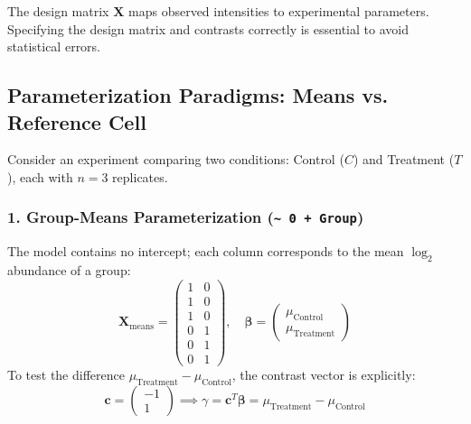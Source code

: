 \documentclass[11pt,twoside,openright]{book}
\begin{document}
The design matrix $\mathbf{X}$ maps observed intensities to experimental parameters. Specifying the design matrix and contrasts correctly is essential to avoid statistical errors.

\subsection{Parameterization Paradigms: Means vs. Reference Cell}

Consider an experiment comparing two conditions: Control ($C$) and Treatment ($T$), each with $n = 3$ replicates.

\subsubsection{1. Group-Means Parameterization (\texttt{\~{} 0 + Group})}
The model contains no intercept; each column corresponds to the mean $\log_2$ abundance of a group:
\begin{equation}
\mathbf{X}_{\text{means}} = \begin{pmatrix}
1 & 0 \\
1 & 0 \\
1 & 0 \\
0 & 1 \\
0 & 1 \\
0 & 1
\end{pmatrix}, \quad 
\boldsymbol{\beta} = \begin{pmatrix} \mu_{\text{Control}} \\ \mu_{\text{Treatment}} \end{pmatrix}
\end{equation}
To test the difference $\mu_{\text{Treatment}} - \mu_{\text{Control}}$, the contrast vector is explicitly:
\begin{equation}
\mathbf{c} = \begin{pmatrix} -1 \\ 1 \end{pmatrix} \implies \gamma = \mathbf{c}^T \boldsymbol{\beta} = \mu_{\text{Treatment}} - \mu_{\text{Control}}
\end{equation}
\end{document}

